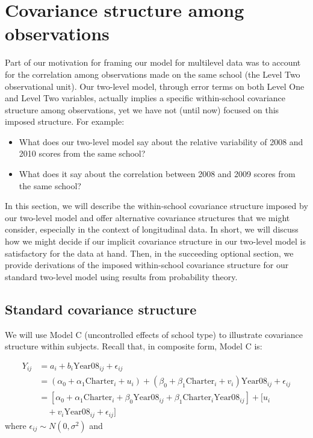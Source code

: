 \documentclass[
]{krantz}
\providecommand{\tightlist}{%
  \setlength{\itemsep}{0pt}\setlength{\parskip}{0pt}}
\begin{document}
\hypertarget{errorcovariance}{%
\section{Covariance structure among observations}\label{errorcovariance}}

Part of our motivation for framing our model for multilevel data was to account for the correlation among observations made on the same school (the Level Two observational unit). Our two-level model, through error terms on both Level One and Level Two variables, actually implies a specific within-school covariance structure  among observations, yet we have not (until now) focused on this imposed structure. For example:

\begin{itemize}
\tightlist
\item
  What does our two-level model say about the relative variability of 2008 and 2010 scores from the same school?
\item
  What does it say about the correlation between 2008 and 2009 scores from the same school?
\end{itemize}

In this section, we will describe the within-school covariance structure imposed by our two-level model and offer alternative covariance structures that we might consider, especially in the context of longitudinal data. In short, we will discuss how we might decide if our implicit covariance structure in our two-level model is satisfactory for the data at hand. Then, in the succeeding optional section, we provide derivations of the imposed within-school covariance structure for our standard two-level model using results from probability theory.

\hypertarget{standarderror}{%
\subsection{Standard covariance structure}\label{standarderror}}

We will use Model C (uncontrolled effects of school type) to illustrate covariance structure within subjects. Recall that, in composite form, Model C is:

\begin{align*}
Y_{ij} & = a_{i}+b_{i}\textrm{Year08}_{ij}+ \epsilon_{ij} \\
       & = (\alpha_{0}+ \alpha_{1}\textrm{Charter}_i + u_{i}) + (\beta_{0}+\beta_{1}\textrm{Charter}_i +v_{i}) \textrm{Year08}_{ij} + \epsilon_{ij} \\
       & = [\alpha_{0}+\alpha_{1}\textrm{Charter}_i + \beta_{0}\textrm{Year08}_{ij} + \beta_{1}\textrm{Charter}_i\textrm{Year08}_{ij}] + [u_{i} \\
       & \quad + v_{i}\textrm{Year08}_{ij} + \epsilon_{ij}]
\end{align*}
\noindent where \(\epsilon_{ij}\sim N(0,\sigma^2)\) and
\end{document}
